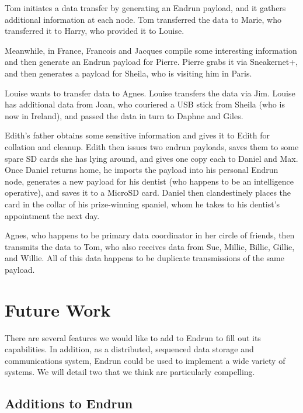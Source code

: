 \documentclass[12pt]{article}
\begin{document}
  Tom initiates a data transfer by generating an Endrun payload, and it gathers additional information at each node. Tom transferred the data to Marie, who transferred it to Harry, who provided it to Louise.
  
  Meanwhile, in France, Francois and Jacques compile some interesting information and then generate an Endrun payload for Pierre. Pierre grabs it via Sneakernet+, and then generates a payload for Sheila, who is visiting him in Paris.
  
  Louise wants to transfer data to Agnes. Louise transfers the data via Jim. Louise has additional data from Joan, who couriered a USB stick from Sheila (who is now in Ireland), and passed the data in turn to Daphne and Giles.
  
  Edith's father obtains some sensitive information and gives it to Edith for collation and cleanup. Edith then issues two endrun payloads, saves them to some spare SD cards she has lying around, and gives one copy each to Daniel and Max. Once Daniel returns home, he imports the payload into his personal Endrun node, generates a new payload for his dentist (who happens to be an intelligence operative), and saves it to a MicroSD card. Daniel then clandestinely places the card in the collar of his prize-winning spaniel, whom he takes to his dentist's appointment the next day.
  
  Agnes, who happens to be primary data coordinator in her circle of friends, then transmits the data to Tom, who also receives data from Sue, Millie, Billie, Gillie, and Willie. All of this data happens to be duplicate transmissions of the same payload.
  
  \section{Future Work}
  
  There are several features we would like to add to Endrun to fill out its capabilities. In addition, as a distributed, sequenced data storage and communications system, Endrun could be used to implement a wide variety of systems. We will detail two that we think are particularly compelling.
  
  \subsection{Additions to Endrun}
  
\end{document}
